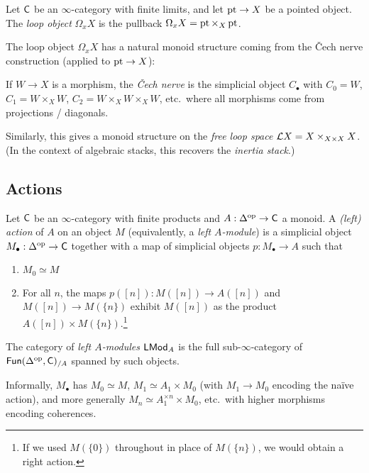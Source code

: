 \documentclass{article}
\begin{document}
\begin{dfn}
	Let $\mathsf{C}$ be an $\infty$-category with finite limits, and let $\operatorname{pt} \to X$ be a pointed object.
	The \emph{loop object} $\Omega_x X$ is the pullback $\Omega_x X = \operatorname{pt} \times_X \operatorname{pt}$.
\end{dfn}

The loop object $\Omega_x X$ has a natural monoid structure coming from the \v{C}ech nerve construction (applied to $\operatorname{pt} \to X$):

\begin{dfn}
	If $W \to X$ is a morphism, the \emph{\v{C}ech nerve} is the simplicial object $C_\bullet$ with $C_0 = W$, $C_1 = W \times_X W$, $C_2 = W \times_X W \times_X W$, etc.\ where all morphisms come from projections / diagonals.
\end{dfn}

Similarly, this gives a monoid structure on the \emph{free loop space} $\mathcal{L} X = X \times_{X \times X} X$.
(In the context of algebraic stacks, this recovers the \emph{inertia stack}.)

\subsection{Actions}

\begin{dfn}
	Let $\mathsf{C}$ be an $\infty$-category with finite products and $A: \Delta^{\mathrm{op}} \to \mathsf{C}$ a monoid.
	A \emph{(left) action} of $A$ on an object $M$ (equivalently, a \emph{left $A$-module}) is a simplicial object $M_\bullet: \Delta^{\mathrm{op}} \to \mathsf{C}$ together with a map of simplicial objects $p: M_\bullet \to A$ such that
	\begin{enumerate}
		\item $M_0 \simeq M$
		\item For all $n$, the maps $p([n]): M([n]) \to A([n])$ and $M([n]) \to M(\{n\})$ exhibit $M([n])$ as the product $A([n]) \times M(\{n\})$.\footnote{If we used $M(\{0\})$ throughout in place of $M(\{n\})$, we would obtain a right action.}
	\end{enumerate}
	The category of \emph{left $A$-modules} $\mathsf{LMod}_A$ is the full sub-$\infty$-category of $\mathsf{Fun}(\Delta^{\mathrm{op}}, \mathsf{C})_{/A}$ spanned by such objects.
\end{dfn}

Informally, $M_\bullet$ has $M_0 \simeq M$, $M_1 \simeq A_1 \times M_0$ (with $M_1 \to M_0$ encoding the na\"ive action), and more generally $M_n \simeq A_1^{\times n} \times M_0$, etc.\ with higher morphisms encoding coherences.
\end{document}

